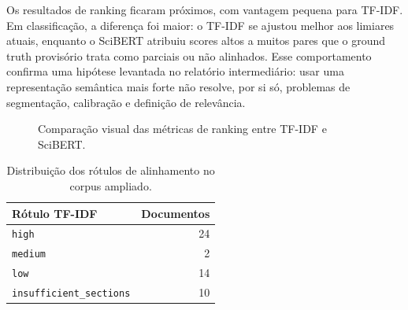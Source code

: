 \documentclass[12pt]{article}
\begin{document}
Os resultados de ranking ficaram próximos, com vantagem pequena para TF-IDF. Em classificação, a diferença foi maior: o TF-IDF se ajustou melhor aos limiares atuais, enquanto o SciBERT atribuiu scores altos a muitos pares que o ground truth provisório trata como parciais ou não alinhados. Esse comportamento confirma uma hipótese levantada no relatório intermediário: usar uma representação semântica mais forte não resolve, por si só, problemas de segmentação, calibração e definição de relevância.

\begin{figure}[h]
    \centering
    \caption{Comparação visual das métricas de ranking entre TF-IDF e SciBERT.}
    \label{fig:ranking}
\end{figure}

\begin{table}[h]
    \centering
    \begin{tabular}{lr}
        \toprule
        Rótulo TF-IDF & Documentos \\
        \midrule
        \texttt{high} & 24 \\
        \texttt{medium} & 2 \\
        \texttt{low} & 14 \\
        \texttt{insufficient\_sections} & 10 \\
        \bottomrule
    \end{tabular}
    \caption{Distribuição dos rótulos de alinhamento no corpus ampliado.}
    \label{tab:distribuicao}
\end{table}
\end{document}
